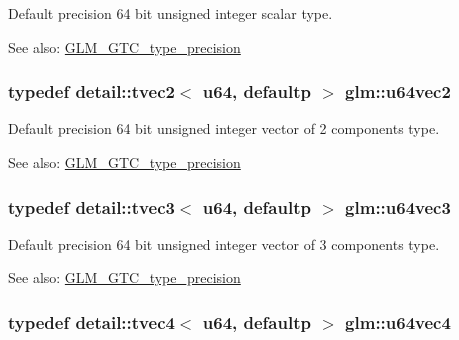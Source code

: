 Default precision 64 bit unsigned integer scalar type. \begin{Desc}
\item[See also:]\hyperlink{group__gtc__type__precision}{GLM\_\-GTC\_\-type\_\-precision} \end{Desc}
\hypertarget{group__gtc__type__precision_gffa78d655fd98b33e47043e2bd38641b}{
\subsubsection[u64vec2]{\setlength{\rightskip}{0pt plus 5cm}typedef detail::tvec2$<$ u64, defaultp $>$ {\bf glm::u64vec2}}}
\label{group__gtc__type__precision_gffa78d655fd98b33e47043e2bd38641b}


Default precision 64 bit unsigned integer vector of 2 components type. \begin{Desc}
\item[See also:]\hyperlink{group__gtc__type__precision}{GLM\_\-GTC\_\-type\_\-precision} \end{Desc}
\hypertarget{group__gtc__type__precision_ge934e74663d832989066cc852560866d}{
\subsubsection[u64vec3]{\setlength{\rightskip}{0pt plus 5cm}typedef detail::tvec3$<$ u64, defaultp $>$ {\bf glm::u64vec3}}}
\label{group__gtc__type__precision_ge934e74663d832989066cc852560866d}


Default precision 64 bit unsigned integer vector of 3 components type. \begin{Desc}
\item[See also:]\hyperlink{group__gtc__type__precision}{GLM\_\-GTC\_\-type\_\-precision} \end{Desc}
\hypertarget{group__gtc__type__precision_g59d78a1ff6d275bbb425dce92f607b9c}{
\subsubsection[u64vec4]{\setlength{\rightskip}{0pt plus 5cm}typedef detail::tvec4$<$ u64, defaultp $>$ {\bf glm::u64vec4}}}
\label{group__gtc__type__precision_g59d78a1ff6d275bbb425dce92f607b9c}


